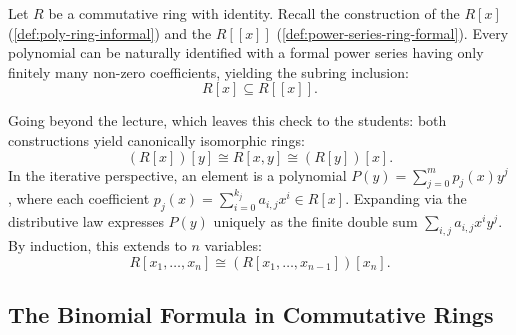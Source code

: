 \begin{content}
Let $R$ be a commutative ring with identity. Recall the construction of the  $R[x]$ (\cref{def:poly-ring-informal}) and the  $R[[x]]$ (\cref{def:power-series-ring-formal}). Every polynomial can be naturally identified with a formal power series having only finitely many non-zero coefficients, yielding the subring inclusion:
\[
R[x] \subseteq R[[x]].
\]


\begin{steps}
Going beyond the lecture, which leaves this check to the students: both constructions yield canonically isomorphic rings:
\[
(R[x])[y] \cong R[x, y] \cong (R[y])[x].
\]
In the iterative perspective, an element is a polynomial $P(y) = \sum_{j=0}^m p_j(x) y^j$, where each coefficient $p_j(x) = \sum_{i=0}^{k_j} a_{i,j} x^i \in R[x]$. Expanding via the distributive law expresses $P(y)$ uniquely as the finite double sum $\sum_{i, j} a_{i,j} x^i y^j$. By induction, this extends to $n$ variables:
\[
R[x_1, \dots, x_n] \cong (R[x_1, \dots, x_{n-1}])[x_n].
\]
\end{steps}
\end{content}

\subsection{The Binomial Formula in Commutative Rings}

